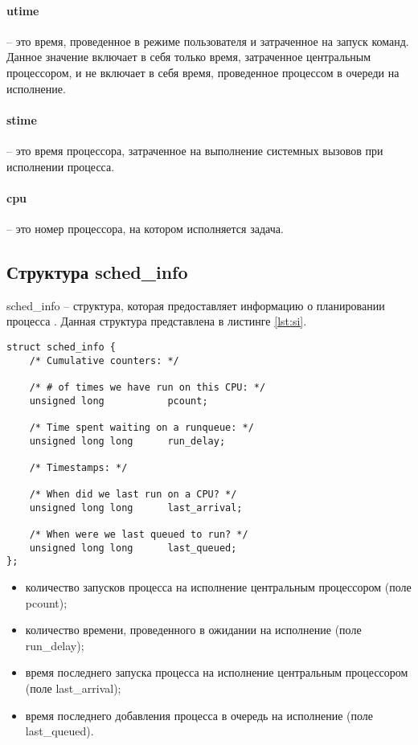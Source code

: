 \paragraph*{utime} -- это время, проведенное в режиме пользователя и затраченное на запуск команд. Данное значение включает в себя только время, затраченное центральным процессором, и не включает в себя время, проведенное процессом в очереди на исполнение.

\paragraph*{stime} -- это время процессора, затраченное на выполнение системных вызовов при исполнении процесса.

\paragraph*{cpu} -- это номер процессора, на котором исполняется задача.

\subsection{Структура sched\_info}
sched\_info -- структура, которая предоставляет информацию о планировании процесса \cite{bib:3}. Данная структура представлена в листинге \ref{lst:si}.

\begin{lstlisting}[label=lst:si,caption=Структура sched\_info. ]
struct sched_info {
	/* Cumulative counters: */

	/* # of times we have run on this CPU: */
	unsigned long			pcount;

	/* Time spent waiting on a runqueue: */
	unsigned long long		run_delay;

	/* Timestamps: */

	/* When did we last run on a CPU? */
	unsigned long long		last_arrival;

	/* When were we last queued to run? */
	unsigned long long		last_queued;
};
\end{lstlisting}

\begin{itemize}
\item количество запусков процесса на исполнение центральным процессором (поле pcount);
\item количество времени, проведенного в ожидании на исполнение (поле run\_delay);
\item время последнего запуска процесса на исполнение центральным процессором (поле last\_arrival);
\item время последнего добавления процесса в очередь на исполнение (поле last\_queued).
\end{itemize}


